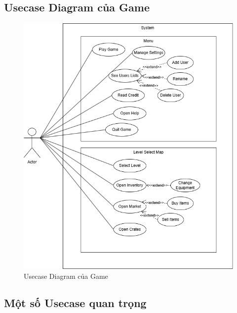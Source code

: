 \subsection{Usecase Diagram của Game}
\begin{figure}[H]
	\centering
	\includegraphics[width=\textwidth]{Images/UseCase.png}
	\vspace{0.5cm}
	\caption{Usecase Diagram của Game}
\end{figure}
\subsection{Một số Usecase quan trọng}
